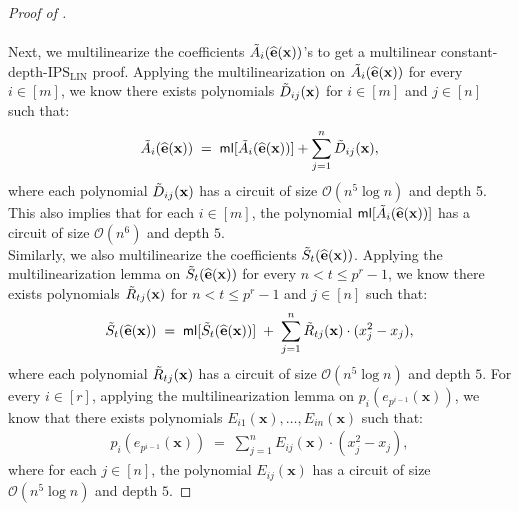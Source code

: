 \documentclass[11pt]{article}
\newcommand{\bigO}{\mathcal{O}}
\newcommand{\IPSLIN}{\mathrm{IPS}_{\mathrm{LIN}}}
\newcommand{\ml}{\mathsf{ml}}
\begin{document}
\begin{proof}[Proof of ]
\paragraph{}Next, we multilinearize the coefficients $\Tilde{A}_{i}(\widehat{\mathbf{e}}(\mathbf{x}))$'s to get a multilinear constant-depth-$\IPSLIN$ proof. Applying the multilinearization  on $\Tilde{A}_{i}(\widehat{\mathbf{e}}(\mathbf{x}))$ for every $i \in [m]$, we know there exists polynomials $\Tilde{D}_{ij}(\mathbf{x})$ for $i \in [m]$ and $j \in [n]$ such that:
\begin{align*}
    \Tilde{A}_{i}(\widehat{\mathbf{e}}(\mathbf{x})) \; = \; \ml[\Tilde{A}_{i}(\widehat{\mathbf{e}}(\mathbf{x}))] + \sum_{j=1}^{n} \Tilde{D}_{ij}(\mathbf{x}),
\end{align*}
where each polynomial $\Tilde{D}_{ij}(\mathbf{x})$ has a circuit of size $\bigO(n^{5} \log n)$ and depth 5. This also implies that for each $i \in [m]$, the polynomial $\ml[\Tilde{A}_{i}(\widehat{\mathbf{e}}(\mathbf{x}))]$ has a circuit of size $\bigO(n^{6})$ and depth $5$.\\
Similarly, we also multilinearize the coefficients $\Tilde{S}_{t}(\widehat{\mathbf{e}}(\mathbf{x}))$. Applying the multilinearization lemma  on $\Tilde{S}_{t}(\widehat{\mathbf{e}}(\mathbf{x}))$ for every $n < t \leq p^{r}-1$, we know there exists polynomials $\Tilde{R}_{tj}(\mathbf{x})$ for $n < t \leq p^{r}-1$ and $j \in [n]$ such that:
\begin{align*}
    \Tilde{S}_{t}(\widehat{\mathbf{e}}(\mathbf{x})) \; = \; \ml[\Tilde{S}_{t}(\widehat{\mathbf{e}}(\mathbf{x}))] \; + \; \sum_{j=1}^{n} \Tilde{R}_{tj}(\mathbf{x}) \cdot (x_{j}^{2} - x_{j}),
\end{align*}
where each polynomial $\Tilde{R}_{tj}(\mathbf{x})$ has a circuit of size $\bigO(n^{5} \log n)$ and depth $5$.\newline
For every $i \in [r]$, applying the multilinearization lemma  on $p_{i}(e_{p^{i-1}}(\mathbf{x}))$, we know that there exists polynomials $E_{i1}(\mathbf{x}), \ldots, E_{in}(\mathbf{x})$ such that:
\begin{align*}
    p_{i}(e_{p^{i-1}}(\mathbf{x})) \; = \; \sum_{j=1}^{n} E_{ij}(\mathbf{x}) \cdot (x_{j}^{2} - x_{j}),
\end{align*}
where for each $j \in [n]$, the polynomial $E_{ij}(\mathbf{x})$ has a circuit of size $\bigO(n^{5} \log n)$ and depth $5$.


\end{proof}
\end{document}
